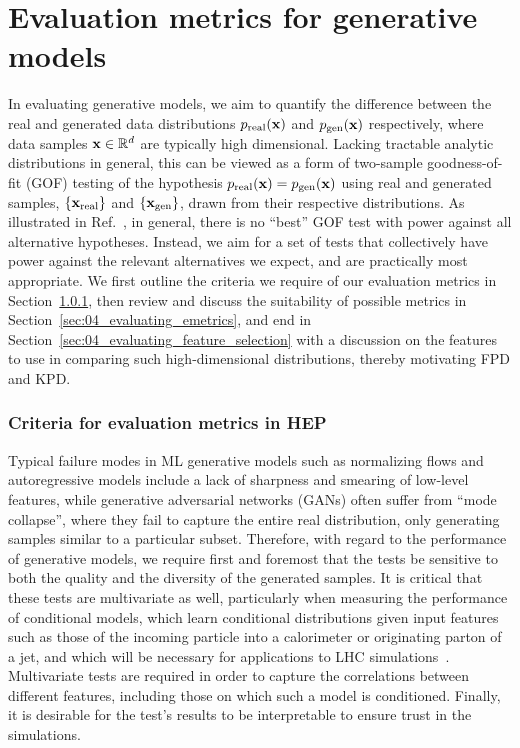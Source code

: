 \section{Evaluation metrics for generative models}
\label{sec:04_evaluating_metrics}

In evaluating generative models, we aim to quantify the difference between the real and generated data distributions $p_\mathrm{real}(\mathbf{x})$ and $p_\mathrm{gen}(\mathbf{x})$ respectively, where data samples $\mathbf{x} \in \mathbb{R}^d$ are typically high dimensional.
Lacking tractable analytic distributions in general, this can be viewed as a form of two-sample goodness-of-fit (GOF) testing of the hypothesis $p_\mathrm{real}(\mathbf{x}) = p_\mathrm{gen}(\mathbf{x})$ using real and generated samples, $\{\mathbf{x}_\mathrm{real}\}$ and $\{\mathbf{x}_\mathrm{gen}\}$, drawn from their respective distributions.
As illustrated in Ref.~\cite{cousins_gof}, in general, there is no ``best'' GOF test with power against all alternative hypotheses. 
Instead, we aim for a set of tests that collectively have power against the relevant alternatives we expect, and are practically most appropriate.
We first outline the criteria we require of our evaluation metrics in Section~\ref{sec:04_evaluating_criteria}, then review and discuss the suitability of possible metrics in Section~\ref{sec:04_evaluating_emetrics}, and end in Section~\ref{sec:04_evaluating_feature_selection} with a discussion on the features to use in comparing such high-dimensional distributions, thereby motivating FPD and KPD.

\subsubsection{Criteria for evaluation metrics in HEP}
\label{sec:04_evaluating_criteria}

Typical failure modes in ML generative models such as normalizing flows and autoregressive models include a lack of sharpness and smearing of low-level features, while generative adversarial networks (GANs) often suffer from ``mode collapse'', where they fail to capture the entire real distribution, only generating samples similar to a particular subset. 
Therefore, with regard to the performance of generative models, we require first and foremost that the tests be sensitive to both the quality and the diversity of the generated samples.
It is critical that these tests are multivariate as well, particularly when measuring the performance of conditional models, which learn conditional distributions given input features such as those of the incoming particle into a calorimeter or originating parton of a jet, and which will be necessary for applications to LHC simulations~\cite{Butter:2022rso}.
Multivariate tests are required in order to capture the correlations between different features, including those on which such a model is conditioned. 
Finally, it is desirable for the test's results to be interpretable to ensure trust in the simulations. 

